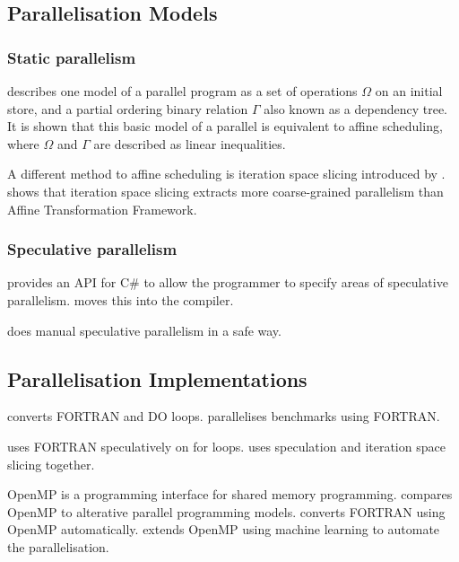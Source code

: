 \documentclass[conference]{IEEEtran}
\begin{document}
\subsection{Parallelisation Models}
\subsubsection{Static parallelism}
\textcite{Feautrier1992,Feautrier1992b} describes one model of a parallel program as a set of operations $\Omega$ on an initial store, and a partial ordering binary relation $\Gamma$ also known as a dependency tree. It is shown that this basic model of a parallel is equivalent to affine scheduling, where $\Omega$ and $\Gamma$ are described as linear inequalities.

A different method to affine scheduling is iteration space slicing introduced by \textcite{Pugh1997}. 
\textcite{Beletska2011} shows that iteration space slicing extracts more coarse-grained parallelism than Affine Transformation Framework.

\subsubsection{Speculative parallelism}
\textcite{Prabhu2010} provides an API for C\# to allow the programmer to specify areas of speculative parallelism.
\textcite{Yiapanis2015} moves this into the compiler.

\textcite{Prabhu2010} does manual speculative parallelism in a safe way.

\subsection{Parallelisation Implementations}
\textcite{DHollander1998} converts FORTRAN and DO loops.
\textcite{Eigenmann1998} parallelises benchmarks using FORTRAN.

\textcite{Rauchwerger1999} uses FORTRAN speculatively on for loops.
\textcite{Quinones2005} uses speculation and iteration space slicing together.

OpenMP is a programming interface for shared memory programming.
\textcite{Dagum1998} compares OpenMP to alterative parallel programming models.
\textcite{Kim2000} converts FORTRAN using OpenMP automatically.
\textcite{Lam2011} extends OpenMP using machine learning to automate the parallelisation.
\end{document}

